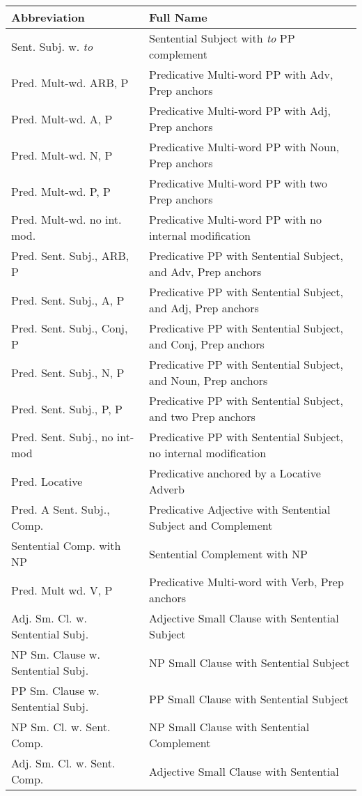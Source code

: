 \small
\begin{tabular}{ll}
Abbreviation&Full Name\\
\hline
Sent. Subj. w. {\it to} & Sentential Subject with {\it to} PP complement \\
Pred. Mult-wd. ARB, P & Predicative Multi-word PP with Adv, Prep anchors\\
Pred. Mult-wd. A, P & Predicative Multi-word PP with Adj, Prep anchors\\
Pred. Mult-wd. N, P & Predicative Multi-word PP with Noun, Prep
anchors\\
Pred. Mult-wd. P, P & Predicative Multi-word PP with two Prep
anchors\\
Pred. Mult-wd. no int. mod. & Predicative Multi-word PP with no internal
modification\\
Pred. Sent. Subj., ARB, P & Predicative PP with Sentential Subject, and
Adv, Prep anchors\\
Pred. Sent. Subj., A, P & Predicative PP with Sentential Subject, and
Adj, Prep anchors\\
Pred. Sent. Subj., Conj, P & Predicative PP with Sentential Subject, and
Conj, Prep anchors\\
Pred. Sent. Subj., N, P & Predicative PP with Sentential Subject, and
Noun, Prep anchors\\
Pred. Sent. Subj., P, P & Predicative PP with Sentential Subject, and two
Prep anchors\\
Pred. Sent. Subj., no int-mod & Predicative PP with Sentential Subject,
no internal modification\\
Pred. Locative & Predicative anchored by a Locative Adverb\\
Pred. A Sent. Subj., Comp. & Predicative Adjective with Sentential
Subject and Complement\\
Sentential Comp. with NP&Sentential Complement with NP\\
Pred. Mult wd. V, P & Predicative Multi-word with Verb, Prep anchors \\
Adj. Sm. Cl. w. Sentential Subj.&Adjective Small Clause with Sentential Subject\\
NP Sm. Clause w. Sentential Subj.&NP Small Clause with Sentential Subject\\
PP Sm. Clause w. Sentential Subj.&PP Small Clause with Sentential Subject\\
NP Sm. Cl. w. Sent. Comp.&NP Small Clause with Sentential Complement\\
Adj. Sm. Cl. w. Sent. Comp.&Adjective Small Clause with Sentential

\end{tabular}
